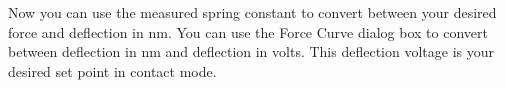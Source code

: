 \documentclass[double,12pt,1in,seploa]{beavtex}
\let\Oldsection\section
\renewcommand{\section}{\FloatBarrier\Oldsection}
\begin{document}
Now you can use the measured spring constant to convert between your desired force and deflection in nm. You can use the Force Curve dialog box to convert between deflection in nm and deflection in volts. This deflection voltage is your desired set point in contact mode.



    
\end{document}
